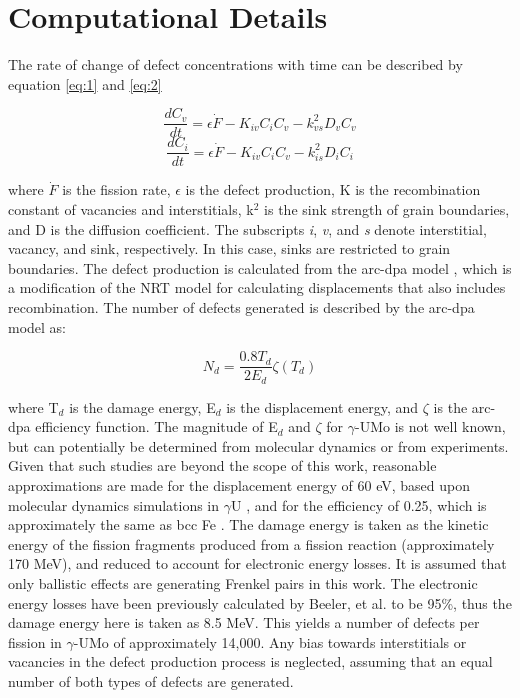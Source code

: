 \documentclass[10pt,review]{elsarticle}
\begin{document}
\section{Computational Details}

The rate of change of defect concentrations with time can be described by equation \ref{eq:1} and \ref{eq:2}

\begin{equation}
\label{eq:1}
\frac{dC_v}{dt} = \epsilon \dot F - K_{iv}C_iC_v - k^2_{vs}D_vC_v
\end{equation}
\begin{equation}
\label{eq:2}
\frac{dC_i}{dt} = \epsilon \dot F - K_{iv}C_iC_v - k^2_{is}D_iC_i
\end{equation}

where $\dot F$ is the fission rate, $\epsilon$ is the defect production, K is the recombination constant of vacancies and interstitials, k$^2$ is the sink strength of grain boundaries, and D is the diffusion coefficient. The subscripts \textit{i}, \textit{v}, and \textit{s} denote interstitial, vacancy, and sink, respectively. In this case, sinks are restricted to grain boundaries. The defect production is calculated from the arc-dpa model \cite{arcdpa}, which is a modification of the NRT model for calculating displacements that also includes recombination. The number of defects generated is described by the arc-dpa model as:

\begin{equation}
\label{eq:3}
N_d = \frac{0.8T_d}{2E_d}\zeta(T_d)
\end{equation}

where T$_d$ is the damage energy, E$_d$ is the displacement energy, and $\zeta$ is the arc-dpa efficiency function. The magnitude of E$_d$ and $\zeta$ for $\gamma$-UMo is not well known, but can potentially be determined from molecular dynamics or from experiments. Given that such studies are beyond the scope of this work, reasonable approximations are made for the displacement energy of 60 eV, based upon molecular dynamics simulations in $\gamma$U \cite{beeler_Ed}, and for the efficiency of 0.25, which is approximately the same as bcc Fe \cite{arcdpa}. The damage energy is taken as the kinetic energy of the fission fragments produced from a fission reaction (approximately 170 MeV), and reduced to account for electronic energy losses. It is assumed that only ballistic effects are generating Frenkel pairs in this work. The electronic energy losses have been previously calculated by Beeler, et al. \cite{beeler_rad} to be 95\%, thus the damage energy here is taken as 8.5 MeV. This yields a number of defects per fission in $\gamma$-UMo of approximately 14,000. Any bias towards interstitials or vacancies in the defect production process is neglected, assuming that an equal number of both types of defects are generated. 
\end{document}
